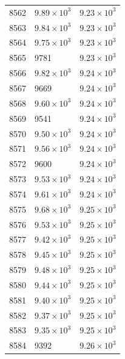 \begin{table}[H]
\begin{tabular}{lll}
8562 & $\displaystyle 9.89 \times 10^{3}$ & $\displaystyle 9.23 \times 10^{3}$ \\
8563 & $\displaystyle 9.84 \times 10^{3}$ & $\displaystyle 9.23 \times 10^{3}$ \\
8564 & $\displaystyle 9.75 \times 10^{3}$ & $\displaystyle 9.23 \times 10^{3}$ \\
8565 & 9781 & $\displaystyle 9.23 \times 10^{3}$ \\
8566 & $\displaystyle 9.82 \times 10^{3}$ & $\displaystyle 9.24 \times 10^{3}$ \\
8567 & 9669 & $\displaystyle 9.24 \times 10^{3}$ \\
8568 & $\displaystyle 9.60 \times 10^{3}$ & $\displaystyle 9.24 \times 10^{3}$ \\
8569 & 9541 & $\displaystyle 9.24 \times 10^{3}$ \\
8570 & $\displaystyle 9.50 \times 10^{3}$ & $\displaystyle 9.24 \times 10^{3}$ \\
8571 & $\displaystyle 9.56 \times 10^{3}$ & $\displaystyle 9.24 \times 10^{3}$ \\
8572 & 9600 & $\displaystyle 9.24 \times 10^{3}$ \\
8573 & $\displaystyle 9.53 \times 10^{3}$ & $\displaystyle 9.24 \times 10^{3}$ \\
8574 & $\displaystyle 9.61 \times 10^{3}$ & $\displaystyle 9.24 \times 10^{3}$ \\
8575 & $\displaystyle 9.68 \times 10^{3}$ & $\displaystyle 9.25 \times 10^{3}$ \\
8576 & $\displaystyle 9.53 \times 10^{3}$ & $\displaystyle 9.25 \times 10^{3}$ \\
8577 & $\displaystyle 9.42 \times 10^{3}$ & $\displaystyle 9.25 \times 10^{3}$ \\
8578 & $\displaystyle 9.45 \times 10^{3}$ & $\displaystyle 9.25 \times 10^{3}$ \\
8579 & $\displaystyle 9.48 \times 10^{3}$ & $\displaystyle 9.25 \times 10^{3}$ \\
8580 & $\displaystyle 9.44 \times 10^{3}$ & $\displaystyle 9.25 \times 10^{3}$ \\
8581 & $\displaystyle 9.40 \times 10^{3}$ & $\displaystyle 9.25 \times 10^{3}$ \\
8582 & $\displaystyle 9.37 \times 10^{3}$ & $\displaystyle 9.25 \times 10^{3}$ \\
8583 & $\displaystyle 9.35 \times 10^{3}$ & $\displaystyle 9.25 \times 10^{3}$ \\
8584 & 9392 & $\displaystyle 9.26 \times 10^{3}$ \\

\end{tabular}
\end{table}
